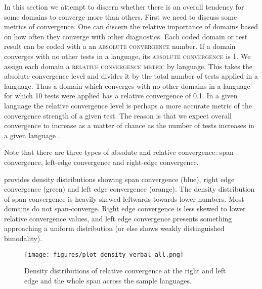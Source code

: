 \documentclass[output=paper,draftmode]{langscibook}
\begin{document}
In this section we attempt to discern whether there is an overall tendency for some domains to converge more than others. First we need to discuss some metrics of convergence.
One can discern the relative importance of domains based on how often they converge with other diagnostics. Each coded domain or test result can be coded with a an \textsc{absolute convergence} number. If a domain converges with no other tests in a language, its \textsc{absolute convergence} is 1. We assign each domain a \textsc{relative convergence metric} by language. This takes the absolute convergence level and divides it by the total number of tests applied in a language. Thus a domain which converges with no other domains in a language for which 10 tests were applied has a relative convergence of 0.1. In a given language the relative convergence level is perhaps a more accurate metric of the convergence strength of a given test. The reason is that we expect overall convergence to increase as a matter of chance as the number of tests increases in a given language \citep{tallmanconstituency2021}.

\hspace*{-3pt}Note that there are three types of absolute and relative convergence: span convergence, left-edge convergence and right-edge convergence.


\hspace*{-3pt} provides density distributions showing span convergence (blue), right edge convergence (green) and left edge convergence (orange). The density distribution of span convergence is heavily skewed leftwards towards lower numbers. Most domains do not span-converge. Right edge convergence is less skewed to lower relative convergence values, and left edge convergence presents something approaching a uniform distribution (or else shows weakly distinguished bimodality).

\begin{figure}
    \texttt{[image: figures/plot\_density\_verbal\_all.png]}
    \caption{Density distributions of relative convergence at the right and left edge and the whole span across the sample languages.}
    \label{discussion:fig:convergence_densitydist}
\end{figure}

\end{document}
